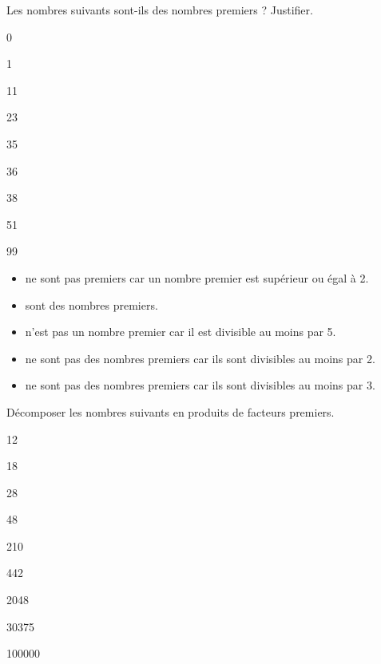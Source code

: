 \begin{Maquette}[Fiche,CorrigeFin,Colonnes=2]{}

   \begin{multicols}{2}

      \begin{exercice} %
         Les nombres suivants sont-ils des nombres premiers ? Justifier.
         \begin{colenumerate}[3]
            \item 0
            \item 1
            \item 11
            \item 23
            \item 35
            \item 36 
            \item 38 
            \item 51 
            \item 99
         \end{colenumerate}
      \end{exercice}
      
      \begin{Solution}
         \begin{itemize}
            \item {} ne sont pas premiers car un nombre premier est supérieur ou égal à 2. 
            \item {} sont des nombres premiers.
            \item {} n'est pas un nombre premier car il est divisible au moins par 5.
            \item {} ne sont pas des nombres premiers car ils sont divisibles au moins par 2.
            \item {} ne sont pas des nombres premiers car ils sont divisibles au moins par 3.
         \end{itemize}
      \end{Solution}


      \begin{exercice} %
         Décomposer les nombres suivants en produits de facteurs premiers.
         \begin{colenumerate}[3]
            \item 12
            \item 18
            \item 28
            \item 48
            \item 210
            \item 442
            \item \num{2048}
            \item \num{30375}
            \item \num{100000}
         \end{colenumerate}
      \end{exercice}


\end{multicols}
\end{Maquette}
